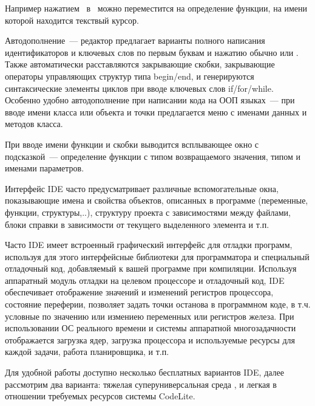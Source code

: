 \secru{\eclipse}

Например нажатием \ в \eclipse\ можно переместится на
  определение функции, на имени которой находится текствый курсор.
  
    Автодополнение\ --- редактор предлагает варианты полного написания
  идентификаторов и ключевых слов по первым буквам и нажатию обычно
   или . Также автоматически расставляются
  закрывающие скобки, закрывающие операторы управляющих структур типа begin/end,
  и генерируются синтаксические элементы циклов при вводе ключевых слов
  if/for/while. Особенно удобно автодополнение при написании кода на ООП 
  языках\  --- при вводе имени класса или объекта и точки предлагается меню с
  именами данных и методов класса. 
  
  При вводе имени функции и скобки выводится всплывающее окно с подсказкой\ ---
  определение функции с типом возвращаемого значения, типом и именами
  параметров.
  
  Интерфейс IDE часто предусматривает различные вспомогательные окна,
  показывающие имена и свойства объектов, описанных в программе (переменные,
  функции, структуры,..), структуру проекта с зависимостями между файлами, блоки
  справки в зависимости от текущего выделенного элемента и т.п.
  
  Часто IDE имеет встроенный графический интерфейс для отладки программ,
  используя для этого интерфейсные библиотеки для программатора и
  специальный отладочный код, добавляемый к вашей программе при
  компиляции. Используя аппаратный модуль отладки на целевом процессоре и
  отладочный код, IDE обеспечивает отображение значений и изменений регистров
  процессора, состояние переферии, позволяет задать точки останова в программном
  коде, в т.ч. условные по значению или измениею переменных или регистров
  железа.
  При использовании ОС реального времени и системы аппаратной многозадачности
  отображается загрузка ядер, загрузка процессора и используемые ресурсы для
  каждой задачи, работа планировщика, и т.п.
  
Для удобной работы доступно несколько бесплатных вариантов IDE, далее
рассмотрим два варианта: тяжелая суперуниверсальная среда \eclipse, и легкая 
в отношении требуемых ресурсов системы CodeLite.
  

